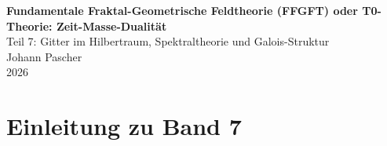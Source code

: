 


	
	\setcounter{section}{0}
	\setcounter{subsection}{0}
	\setcounter{subsubsection}{0}
	\setcounter{paragraph}{0}
	
	\setcounter{secnumdepth}{1}  %
	\makeatletter
	\renewcommand*\l@part[2]{%
		\ifnum \c@tocdepth >-2\relax
		\addpenalty{-\@highpenalty}%
		\addvspace{0.8em \@plus\p@}%
		{\leftskip 0em \relax
			\rightskip \@tocrmarg
			\parfillskip -\rightskip
			\parindent 0em \relax\@afterindenttrue
			\interlinepenalty\@M
			\leavevmode
			{\footnotesize\bfseries #1}\nobreak
			\leaders\hbox{$\m@th\mkern \@dotsep mu\hbox{}\mkern \@dotsep mu$}\hfill
			\nobreak\hb@xt@\@pnumwidth{\hss #2}\par}%
		\addvspace{0.2em \@plus\p@}%
		\nobreak
		\fi}
	\makeatother
	
	\renewcommand{\cftchapfont}{\footnotesize\bfseries}
	\renewcommand{\cftchappagefont}{\footnotesize\bfseries}
	\setlength{\cftbeforechapskip}{0.3em}
	
	\setcounter{tocdepth}{0}
	

	\begin{titlepage}
		\centering
		\vspace*{2cm}
	{\Huge\textbf{Fundamentale Fraktal-Geometrische Feldtheorie (FFGFT) oder T0-Theorie: Zeit-Masse-Dualität}}\\[1cm]
	{\Large Teil 7: Gitter im Hilbertraum, Spektraltheorie und Galois-Struktur}\\[2cm]
		{\large Johann Pascher}\\[1cm]
		{\large 2026}
		\vfill
	\end{titlepage}

	\frontmatter
	\pagestyle{fancy}
	\makeatletter
	\let\ps@plain\ps@fancy
	\let\ps@empty\ps@fancy
	\makeatother

	\mainmatter
	\pagestyle{fancy}
	\tableofcontents

	\chapter{Einleitung zu Band 7}
	

